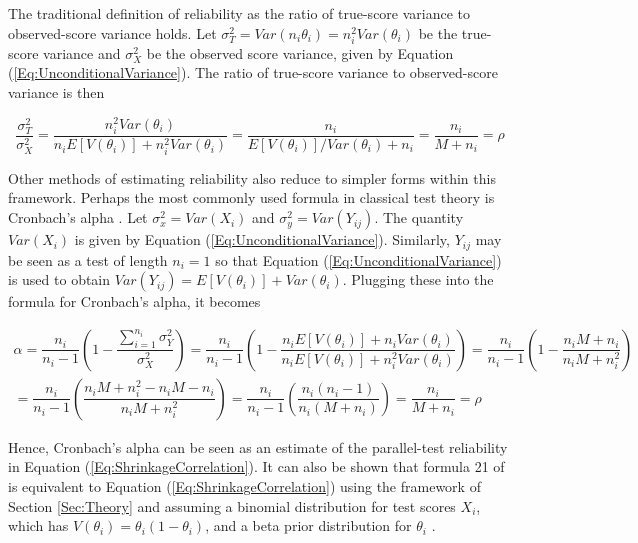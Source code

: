 \documentclass[12pt,epsfig]{article}
\begin{document}
The traditional definition of reliability as the ratio of true-score variance to observed-score variance holds. Let $\sigma^2_T = Var(n_i \theta_i) = n_i^2 Var(\theta_i)$ be the true-score variance and $\sigma^2_X$ be the observed score variance, given by Equation (\ref{Eq:UnconditionalVariance}). The ratio of true-score variance to observed-score variance is then

\begin{equation*}
    \dfrac{\sigma^2_{T}}{\sigma^2_X} = \dfrac{n_i^2 Var(\theta_i)}{n_i E[V(\theta_i)] + n_i^2 Var(\theta_i)} = \dfrac{n_i}{E[V(\theta_i)]/Var(\theta_i) + n_i} = \dfrac{n_i}{M + n_i} = \rho
\end{equation*}


Other methods of estimating reliability also reduce to simpler forms within this framework. Perhaps the most commonly used formula in classical test theory is Cronbach's alpha \citep{Cronbach1951}. Let $\sigma^2_x = Var(X_i)$ and $\sigma^2_y = Var(Y_{ij})$. The quantity $Var(X_i)$ is given by Equation (\ref{Eq:UnconditionalVariance}). Similarly, $Y_{ij}$ may be seen as a test of length $n_i = 1$ so that Equation (\ref{Eq:UnconditionalVariance}) is used to obtain $Var(Y_{ij}) = E[V(\theta_i)] + Var(\theta_i)$. Plugging these into the formula for Cronbach's alpha, it becomes

\begin{multline*}
    \alpha = \dfrac{n_i}{n_i-1} \displaystyle \left(1 - \dfrac{\sum_{i = 1}^{n_i} \sigma^2_Y}{\sigma^2_X}\right) = \dfrac{n_i}{n_i-1} \displaystyle \left(1 - \dfrac{n_i E[V(\theta_i)] + n_i Var(\theta_i)}{n_i E[V(\theta_i)] + n_i^2 Var(\theta_i)}\right) = \dfrac{n_i}{n_i-1} \displaystyle \left(1 - \dfrac{n_i M + n_i }{n_i M + n_i^2 }\right)\\
    = \dfrac{n_i}{n_i - 1}\left(\dfrac{n_iM + n_i^2 - n_i M - n_i}{n_i M + n_i^2}\right) = \dfrac{n_i}{n_i - 1}\left(\dfrac{n_i (n_i - 1)}{n_i(M + n_i)}\right) = \dfrac{n_i}{M + n_i} = \rho
\end{multline*}


\noindent Hence, Cronbach's alpha can be seen as an estimate of the parallel-test reliability in Equation (\ref{Eq:ShrinkageCorrelation}). It can also be shown that formula 21 of \cite{Kuder1937} is equivalent to Equation (\ref{Eq:ShrinkageCorrelation}) using the framework of Section \ref{Sec:Theory} and assuming a binomial distribution for test scores $X_i$, which has $V(\theta_i) = \theta_i (1 - \theta_i)$, and a beta prior distribution for $\theta_i$ \citep{Keats1962}.
\end{document}

